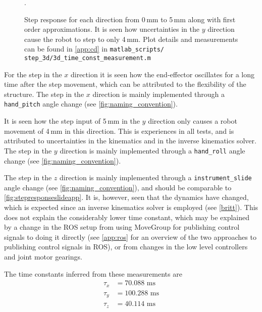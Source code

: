 \begin{figure}[h]
	\centering
	\hspace{1mm}
	\hspace{1mm}
	\caption{Step response for each direction  from 0\,mm to 5\,mm along with first order approximations. It is seen how uncertainties in the $y$ direction cause the robot to step to only 4\,mm. Plot details and measurements can be found in \autoref{app:cd} in \texttt{matlab\_scripts/ step\_3d/3d\_time\_const\_measurement.m}}. 
	\label{fig:stepresponses_xyz}
\end{figure}

For the step in the $x$ direction it is seen how the end-effector oscillates for a long time after the step movement, which can be attributed to the flexibility of the structure. The step in the $x$ direction is mainly implemented through a \texttt{hand\_pitch} angle change (see \autoref{fig:naming_convention}).

It is seen how the step input of 5\,mm in the $y$ direction only causes a robot movement of 4\,mm in this direction. This is experiences in all tests, and is attributed to uncertainties in the kinematics and in the inverse kinematics solver. The step in the $y$ direction is mainly implemented through a \texttt{hand\_roll} angle change (see \autoref{fig:naming_convention}).

The step in the $z$ direction is mainly implemented through a \texttt{instrument\_slide} angle change (see \autoref{fig:naming_convention}), and should be comparable to \autoref{fig:stepresponseslideapp}. It is, however, seen that the dynamics have changed, which is expected since an inverse kinematics solver is employed (see \autoref{britt}). This does not explain the considerably lower time constant, which may be explained by a change in the ROS setup from using MoveGroup for publishing control signals to doing it directly (see \autoref{app:ros} for an overview of the two approaches to publishing control signals in ROS), or from changes in the low level controllers and joint motor gearings.




The time constants inferred from these measurements are
\begin{align*}
\tau_x &= 70.088 \text{ ms}\\
\tau_y &= 100.288 \text{ ms}\\
\tau_z &= 40.114 \text{ ms}
\end{align*}

